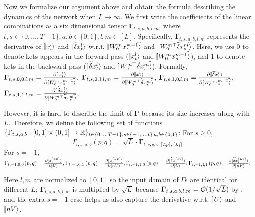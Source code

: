 \documentclass{article}
\theoremstyle{plain}
\theoremstyle{definition}
\begin{document}
Now we formalize our argument above and obtain the formula describing the dynamics of the network when $L\to \infty$. We first write the coefficients of the linear combinations as a six dimensional tensor $\mathbf \Gamma_{t,s,a,b, l, m}$, where $t,s\in \{0,\ldots, T-1\}, a,b\in \{0, 1\}, l, m\in [L]$. Specifically, $\mathbf \Gamma_{t,s,a,b, l, m}$ represents the derivative of $\ket{x_t^l}$ and  $\ket{\tilde\del x_t^l}$ w.r.t. $\hatket{W_0^mx_s^{m-1}}$ and $\hatket{W_0^{m\top}\tilde\del x_s^m}$. Here, we use $0$ to denote kets appears in the forward pass ($\ket{x_t^l}$ and $\hatket{W_0^mx_s^{m-1}}$), and $1$ to denote kets in the backward pass ($\ket{\tilde\del x_t^l}$ and $\hatket{W_0^{m\top}\tilde\del x_s^m}$). Formally, $\mathbf \Gamma_{t,s,0,0,l,m}=\frac{\partial \ket{x_t^l}}{\partial \hatket{W_0^mx_s^{m-1}}}$, $\mathbf \Gamma_{t,s,0,1,l,m}=\frac{\partial \ket{x_t^l}}{\partial \hatket{W_0^{m\top}\tilde\del x_s^m}}$, $\mathbf \Gamma_{t,s,1,0,l,m}=\frac{\partial \ket{\tilde\del x_t^l}}{\partial \hatket{W_0^{m} x_s^{m-1}}}$, $\mathbf \Gamma_{t,s,1,1,l,m}=\frac{\partial \ket{\tilde\del x_t^l}}{\partial \hatket{W_0^{m\top}\tilde\del x_s^m}}$.

However, it is hard to describe the limit of $\mathbf \Gamma$ because its size increases along with $L$. Therefore, we define the following set of functions $\{\Gamma_{t,s,a,b}:[0,1]\times (0, 1] \to \mathbb{R}\}_{t \in \{0,\ldots, T-1\},s\in \{-1, \ldots, t\}, a,b\in \{0,1\}}$:
For $s \geq 0$, %
\[\Gamma_{t,s,a,b}\left(p,q\right) = \sqrt L \cdot \mathbf{\Gamma}_{t,s,a,b,\lceil Lp\rceil,\lceil Lq\rceil}\]
For $s=-1$, $\Gamma_{t,-1,0,0}\left(p,q\right)=\frac{\partial \ket{x_t^{\lceil Lp\rceil}}}{\partial \ket{U}}, 
\Gamma_{t,-1,0,1}\left(p,q\right)=\frac{\partial \ket{x_t^{\lceil Lp\rceil}}}{\partial \ket{nV}}, \Gamma_{t,-1,1,0}\left(p,q\right)=\frac{\partial \ket{\tilde\del x_t^{\lceil Lp\rceil}}}{\partial \ket{U}}, 
\Gamma_{t,-1,1,1}\left(p,q\right)=\frac{\partial \ket{\tilde\del x_t^{\lceil Lp\rceil}}}{\partial \ket{nV}}.$

Here $l, m$ are normalized to $[0,1]$ so the input domain of $\Gamma$s are identical for different $L$; $\mathbf{\Gamma}_{t,s,a,b,l,m}$ is multiplied by $\sqrt L$ because $\mathbf{\Gamma}_{t,s,a,b,l,m}=\mathcal{O}(1/\sqrt L)$ by ; and the extra $s=-1$ case helps us also capture the derivative w.r.t. $\ket U$ and $\ket{nV}$.
\end{document}
